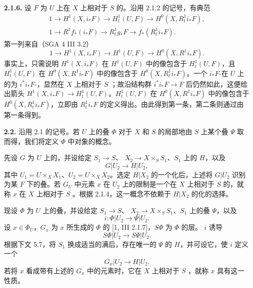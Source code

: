 \textbf{2.1.6.} 设 $F$ 为 $U$ 上在 $X$ 上相对于 $S$ 的。沿用 2.1.2 的记号，有典范
\[
\begin{gathered}
1\longrightarrow H^1(X,i_*F)\longrightarrow H^1_t(U,F)\longrightarrow H^0(X,R^1_ti_*F),\\
1\longrightarrow R^1f_*(i_*F)\longrightarrow R^1_tg_*F\longrightarrow f_*(R^1_ti_*F).
\end{gathered}\tag{2.1.6.1}
\]
第一列来自（SGA 4 III 3.2）
\[1\longrightarrow H^1(X,i_*F)\longrightarrow H^1(U,F)\longrightarrow H^0(X,R^1i_*F).\]
事实上，只需说明 $H^1(X,i_*F)$ 在 $H^1(U,F)$ 中的像包含于 $H^1_t(U,F)$，且 $H^1_t(U,F)$ 在 $H^0(X,R^1i_*F)$ 中的像包含于 $H^0(X,R^1_ti_*F)$。一个 $i_*F$-在 $U$ 上的为 $i^*i_*F$-，显然在 $X$ 上相对于 $S$ ；故沿结构群 $i^*i_*F\to F$ 后仍然如此，这便给出箭头 $H^1(X,i_*F)\to H^1_t(U,F)$。$H^1_t(U,F)$ 在 $H^0(X,R^1i_*F)$ 中的像包含于 $H^0(X,R^1_ti_*F)$，立即由 $R^1_ti_*F$ 的定义得出。由此得到第一条，第二条则通过由第一条得到。

\textbf{2.2.} 沿用 2.1 的记号。若 $U$ 上的叠 $\Phi$ 对于 $X$ 和 $S$ 的局部地由 $S$ 上某个叠 $\Psi$ 取而得，我们将定义 $\Phi$ 中对象的概念。

先设 $G$ 为 $U$ 上的，并设给定 $S_1\to S$、 $X_2\to X\times_SS_1$、$S_1$ 上的 $H$，以及
\[G|U_2\longrightarrow H|U_2,\]
其中 $U_1=U\times_XX_1$、$U_2=U\times_XX_2$。选定 $H|X_2$ 的一个化后，上述将 $G|U_2$ 识别为某 $F$ 下的叠。若 $G_U$ 中元素 $x$ 在 $U_2$ 上的限制是一个在 $X$ 上相对于 $S$ 的，就称 $x$ 在 $X$ 上相对于 $S$ 。根据 2.1.4，这一概念不依赖于 $H|X_2$ 的化的选择。

现设 $\Phi$ 为 $U$ 上的叠，并设给定 $S_1\to S$、 $X_2\to X\times_SS_1$、$S_1$ 上的叠 $\Psi$，以及
\[i:\Phi|U_2\longrightarrow\Psi|U_2.\]
设 $x\in\Phi_U$，$G_x$ 为 $x$ 所生成的 $\Phi$ 的 [1, III 2.1.7]，$S\Phi$ 为 $\Phi$ 的层。 $i$ 诱导
\[S\Phi|U_2\longrightarrow S\Psi|U_2.\]
根据下文 5.7，将 $S_1$ 换成适当的满后，存在唯一的 $\Psi$ 的 $H$，并可设它，使 $i$ 定义一个
\[G_x|U_2\longrightarrow H|U_2.\]
若将 $x$ 看成带有上述的 $G_x$ 中的元素时，它在 $X$ 上相对于 $S$ ，就称 $x$ 具有这一性质。

